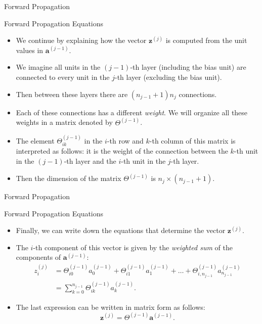 \documentclass[8pt,american]{beamer}
\begin{document}
\begin{frame}{Forward Propagation}

\begin{block}{Forward Propagation Equations}
\begin{itemize}
\justifying
\item We continue by explaining how the vector $\mathbf{z}^{\left(j\right)}$ is
  computed from the unit values in $\mathbf{a}^{\left(j-1\right)}$.
\item We imagine all units in the $\left(j-1\right)$-th layer (including the
  bias unit) are connected to every unit in the $j$-th layer (excluding the
  bias unit).
\item Then between these layers there are $\left(n_{j-1}+1\right)n_{j}$
  connections.
\item Each of these connections has a different \textit{weight}. We will
  organize all these weights in a matrix denoted by $\Theta^{\left(j-1\right)}$.
\item The element $\Theta_{ik}^{\left(j-1\right)}$ in the $i$-th row and $k$-th
  column of this matrix is interpreted as follows: it is the weight of the
  connection between the $k$-th unit in the $\left(j-1\right)$-th layer and the
  $i$-th unit in the $j$-th layer.
\item Then the dimension of the matrix $\Theta^{\left(j-1\right)}$ is
  $n_{j}\times\left(n_{j-1}+1\right)$.
\end{itemize}
\end{block}

\end{frame}

\begin{frame}{Forward Propagation}

\begin{block}{Forward Propagation Equations}
\begin{itemize}
\justifying
\item Finally, we can write down the equations that determine the vector
  $\mathbf{z}^{\left(j\right)}$.
\item The $i$-th component of this vector is given by the \textit{weighted sum}
  of the components of $\mathbf{a}^{\left(j-1\right)}$:
  \begin{align}
  \nonumber z_{i}^{\left(j\right)}&=\Theta_{i0}^{\left(j-1\right)}a_{0}^{\left(j-1\right)}+\Theta_{i1}^{\left(j-1\right)}a_{1}^{\left(j-1\right)}+\ldots+\Theta_{i,n_{j-1}}^{\left(j-1\right)}a_{n_{j-1}}^{\left(j-1\right)}\\
  &=\sum_{k=0}^{n_{j-1}}\Theta_{ik}^{\left(j-1\right)}a_{k}^{\left(j-1\right)}.
  \end{align}
\item The last expression can be written in matrix form as follows:
  \begin{equation}
  \mathbf{z}^{\left(j\right)}=\Theta^{\left(j-1\right)}\mathbf{a}^{\left(j-1\right)}.
  \end{equation}
\end{itemize}
\end{block}

\end{frame}
\end{document}
